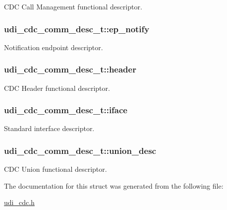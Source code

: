 \-C\-D\-C \-Call \-Management functional descriptor. 

\hypertarget{structudi__cdc__comm__desc__t_ae4f839a855f80e1942ae1de4cd5562d3}{
\subsubsection[{ep\-\_\-notify}]{ {\bf udi\-\_\-cdc\-\_\-comm\-\_\-desc\-\_\-t\-::ep\-\_\-notify}}}
\label{structudi__cdc__comm__desc__t_ae4f839a855f80e1942ae1de4cd5562d3}


\-Notification endpoint descriptor. 

\hypertarget{structudi__cdc__comm__desc__t_a398a1894f61cb98fe155d0d9e6318be1}{
\subsubsection[{header}]{ {\bf udi\-\_\-cdc\-\_\-comm\-\_\-desc\-\_\-t\-::header}}}
\label{structudi__cdc__comm__desc__t_a398a1894f61cb98fe155d0d9e6318be1}


\-C\-D\-C \-Header functional descriptor. 

\hypertarget{structudi__cdc__comm__desc__t_a6dfc36e8b57260fa2e77bea312a164da}{
\subsubsection[{iface}]{ {\bf udi\-\_\-cdc\-\_\-comm\-\_\-desc\-\_\-t\-::iface}}}
\label{structudi__cdc__comm__desc__t_a6dfc36e8b57260fa2e77bea312a164da}


\-Standard interface descriptor. 

\hypertarget{structudi__cdc__comm__desc__t_aa23728196c57ec96df6a1372c5696313}{
\subsubsection[{union\-\_\-desc}]{ {\bf udi\-\_\-cdc\-\_\-comm\-\_\-desc\-\_\-t\-::union\-\_\-desc}}}
\label{structudi__cdc__comm__desc__t_aa23728196c57ec96df6a1372c5696313}


\-C\-D\-C \-Union functional descriptor. 



\-The documentation for this struct was generated from the following file\-:\begin{DoxyCompactItemize}
\item 
\hyperlink{udi__cdc_8h}{udi\-\_\-cdc.\-h}\end{DoxyCompactItemize}
